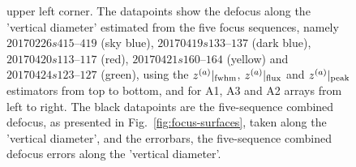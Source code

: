 \begin{figure}
{    upper left corner. The datapoints show the defocus along the
    'vertical diameter' estimated from the five focus sequences,
    namely $20170226s415\mbox{--}419$ (sky blue),
    $20170419s133\mbox{--}137$ (dark blue), $20170420s113\mbox{--}117$ (red),
    $20170421s160\mbox{--}164$ (yellow) and $20170424s123\mbox{--}127$
    (green), using the $z^{(a)}|_{\rm{fwhm}}$, $z^{(a)}|_{\rm{flux}}$ and
    $z^{(a)}|_{\rm{peak}}$ estimators from top to bottom, and for A1, A3 and
    A2 arrays from left to right. The black datapoints are the five-sequence combined defocus, as
    presented in Fig.~\ref{fig:focus-surfaces}, taken along the
    'vertical diameter', and the errorbars, the
    five-sequence combined defocus errors along the 'vertical
    diameter'.}
\label{fig:focus-stability-H}
\end{figure}


